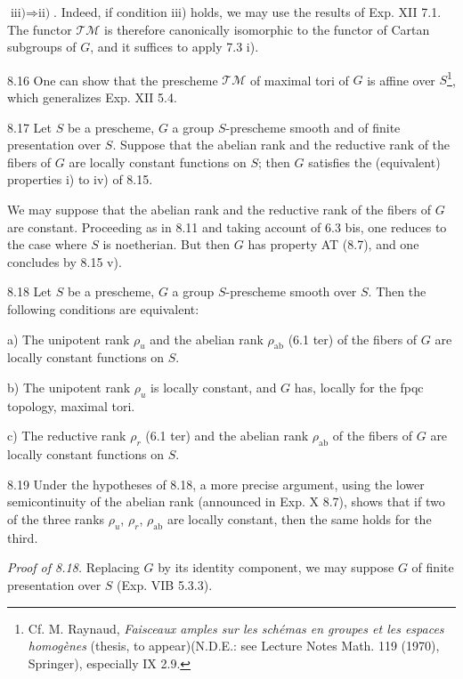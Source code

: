 $\text{iii)}\Rightarrow\text{ii)}$. Indeed, if condition iii) holds, we may use the results of Exp. XII 7.1. The functor $\mathscr{TM}$ is therefore canonically isomorphic to the functor of Cartan subgroups of $G$, and it suffices to apply 7.3 i).
\begin{remark}{8.16}\label{XV.8.16}
One can show that the prescheme $\mathscr{TM}$ of maximal tori of $G$ is affine over $S${\renewcommand{\thefootnote}{*}\footnote{Cf. M. Raynaud, \emph{Faisceaux amples sur les schémas en groupes et les espaces homogènes} (thesis, to appear)(N.D.E.: see Lecture Notes Math. 119 (1970), Springer), especially IX 2.9.}}\setcounter{footnote}{10}, which generalizes Exp. XII 5.4.
\end{remark}
\begin{corollary}{8.17}\label{XV.8.17}
Let $S$ be a prescheme, $G$ a group $S$-prescheme smooth and of finite presentation over $S$. Suppose that the abelian rank and the reductive rank of the fibers of $G$ are locally constant functions on $S$; then $G$ satisfies the (equivalent) properties i) to iv) of 8.15.
\end{corollary}
We may suppose that the abelian rank and the reductive rank of the fibers of $G$ are constant. Proceeding as in 8.11 and taking account of 6.3 bis, one reduces to the case where $S$ is noetherian. But then $G$ has property AT (8.7), and one concludes by 8.15 v).
\begin{corollary}{8.18}\label{XV.8.18}
Let $S$ be a prescheme, $G$ a group $S$-prescheme smooth over $S$. Then the following conditions are equivalent:

\noindent a) The unipotent rank $\rho_u$ and the abelian rank $\rho_{\mathrm{ab}}$ (6.1 ter) of the fibers of $G$ are locally constant functions on $S$.

\noindent b) The unipotent rank $\rho_u$ is locally constant, and $G$ has, locally for the fpqc topology, maximal tori.

\noindent c) The reductive rank $\rho_r$ (6.1 ter) and the abelian rank $\rho_{\mathrm{ab}}$ of the fibers of $G$ are locally constant functions on $S$.
\end{corollary}
\begin{remarks}{8.19}\label{XV.8.19}
Under the hypotheses of 8.18, a more precise argument, using the lower semicontinuity of the abelian rank (announced in Exp. X 8.7), shows that if two of the three ranks $\rho_u$, $\rho_r$, $\rho_{\mathrm{ab}}$ are locally constant, then the same holds for the third.
\end{remarks}
\par\noindent\emph{Proof of 8.18.}
Replacing $G$ by its identity component, we may suppose $G$ of finite presentation over $S$ (Exp. VIB 5.3.3).

